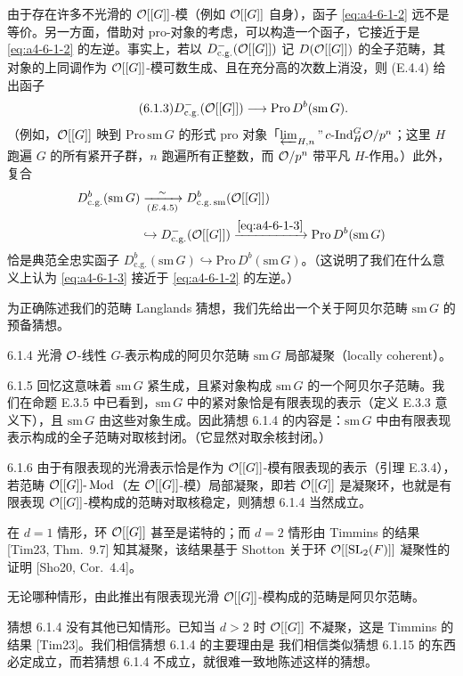 由于存在许多不光滑的 $\mathcal{O}[[G]]$-模（例如 $\mathcal{O}[[G]]$ 自身），函子 \eqref{eq:a4-6-1-2} 远不是等价。另一方面，借助对 pro-对象的考虑，可以构造一个函子，它接近于是 \eqref{eq:a4-6-1-2} 的左逆。事实上，若以 $D^-_{\mathrm{c.g.}}(\mathcal{O}[[G]])$ 记 $D(\mathcal{O}[[G]])$ 的全子范畴，其对象的上同调作为 $\mathcal{O}[[G]]$-模可数生成、且在充分高的次数上消没，则 (E.4.4) 给出函子
\begin{equation}\tag{6.1.3}\label{eq:a4-6-1-3}
D^-_{\mathrm{c.g.}}(\mathcal{O}[[G]])\longrightarrow\mathrm{Pro}\,D^b(\mathrm{sm}\,G).
\end{equation}
（例如，$\mathcal{O}[[G]]$ 映到 $\mathrm{Pro}\,\mathrm{sm}\,G$ 的形式 pro 对象「$\varprojlim_{H,n}"\,c\text{-}\mathrm{Ind}_H^G\mathcal{O}/p^n$；这里 $H$ 跑遍 $G$ 的所有紧开子群，$n$ 跑遍所有正整数，而 $\mathcal{O}/p^n$ 带平凡 $H$-作用。）此外，复合
\[
\begin{aligned}
D^b_{\mathrm{c.g.}}(\mathrm{sm}\,G)&\xrightarrow[(E.4.5)]{\ \sim\ }D^b_{\mathrm{c.g.}\,\mathrm{sm}}(\OO[[G]])\\
&\hookrightarrow D^-_{\mathrm{c.g.}}(\OO[[G]])\xrightarrow{\eqref{eq:a4-6-1-3}}\mathrm{Pro}\,D^b(\mathrm{sm}\,G)
\end{aligned}
\]
恰是典范全忠实函子 $D^b_{\mathrm{c.g.}}(\mathrm{sm}\,G)\hookrightarrow\mathrm{Pro}\,D^b(\mathrm{sm}\,G)$。（这说明了我们在什么意义上认为 \eqref{eq:a4-6-1-3} 接近于 \eqref{eq:a4-6-1-2} 的左逆。）

为正确陈述我们的范畴 Langlands 猜想，我们先给出一个关于阿贝尔范畴 $\mathrm{sm}\,G$ 的预备猜想。

\begin{conj}{6.1.4}\label{thm:a4-6-1-4}
光滑 $\mathcal{O}$-线性 $G$-表示构成的阿贝尔范畴 $\mathrm{sm}\,G$ 局部凝聚（locally coherent）。
\end{conj}

\begin{rem}{6.1.5}\label{thm:a4-6-1-5}
回忆这意味着 $\mathrm{sm}\,G$ 紧生成，且紧对象构成 $\mathrm{sm}\,G$ 的一个阿贝尔子范畴。我们在命题 E.3.5 中已看到，$\mathrm{sm}\,G$ 中的紧对象恰是有限表现的表示（定义 E.3.3 意义下），且 $\mathrm{sm}\,G$ 由这些对象生成。因此猜想 6.1.4 的内容是：$\mathrm{sm}\,G$ 中由有限表现表示构成的全子范畴对取核封闭。（它显然对取余核封闭。）
\end{rem}

\begin{rem}{6.1.6}\label{thm:a4-6-1-6}
由于有限表现的光滑表示恰是作为 $\mathcal{O}[[G]]$-模有限表现的表示（引理 E.3.4），若范畴 $\mathcal{O}[[G]]\text{-}\operatorname{Mod}$（左 $\mathcal{O}[[G]]$-模）局部凝聚，即若 $\mathcal{O}[[G]]$ 是凝聚环，也就是有限表现 $\mathcal{O}[[G]]$-模构成的范畴对取核稳定，则猜想 6.1.4 当然成立。

在 $d=1$ 情形，环 $\mathcal{O}[[G]]$ 甚至是诺特的；而 $d=2$ 情形由 Timmins 的结果 [Tim23, Thm.\ 9.7] 知其凝聚，该结果基于 Shotton 关于环 $\mathcal{O}[[\mathrm{SL}_2(F)]]$ 凝聚性的证明 [Sho20, Cor.\ 4.4]。

无论哪种情形，由此推出有限表现光滑 $\mathcal{O}[[G]]$-模构成的范畴是阿贝尔范畴。

猜想 6.1.4 没有其他已知情形。已知当 $d>2$ 时 $\mathcal{O}[[G]]$ 不凝聚，这是 Timmins 的结果 [Tim23]。我们相信猜想 6.1.4 的主要理由是
我们相信类似猜想 6.1.15 的东西必定成立，而若猜想 6.1.4 不成立，就很难一致地陈述这样的猜想。
\end{rem}

